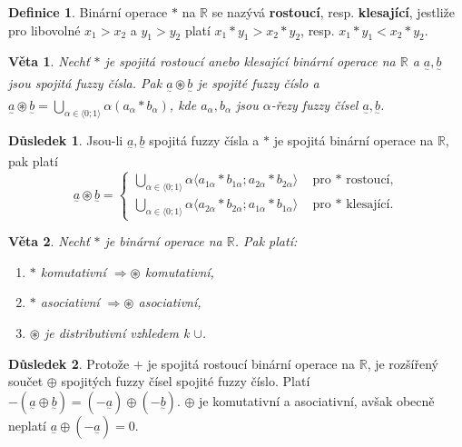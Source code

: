 \documentclass[a4]{report}
\newcommand{\fa}{\underset{^\sim}a}
\newcommand{\fb}{\underset{^\sim}b}
\newtheorem{theorem}{Věta}
\theoremstyle{definition}
\newtheorem{definition}{Definice}[section]
\newtheorem{dusledek}{Důsledek}[section]
\begin{document}
{\begin{definition}
Binární operace $\ast$ na $\mathbb{R}$ se nazývá \textbf{rostoucí}, resp. \textbf{klesající}, jestliže pro libovolné $x_1 > x_2$ a $y_1 > y_2$ platí $x_1 \ast y_1 > x_2 \ast y_2$, resp. $x_1 \ast y_1 < x_2 \ast y_2$.
\end{definition}

\begin{theorem}
Nechť $\ast$ je spojitá rostoucí anebo klesající binární operace na $\mathbb{R}$ a $\fa, \fb$ jsou spojitá fuzzy čísla. Pak $\fa \circledast \fb$ je spojité fuzzy číslo a $\fa \circledast \fb = \bigcup\limits_{\alpha \in \langle 0; 1 \rangle} \alpha (a_{\alpha} \ast b_{\alpha})$, kde $a_{\alpha}, b_{\alpha}$ jsou $\alpha$-řezy fuzzy čísel $\fa, \fb$.
\end{theorem}

\begin{dusledek}
Jsou-li $\fa, \fb$ spojitá fuzzy čísla a $\ast$ je spojitá binární operace na $\mathbb{R}$, pak platí
\begin{equation*}
\fa \circledast \fb =
\begin{cases}
\bigcup\limits_{\alpha \in \langle 0; 1 \rangle} \alpha \langle a_{1\alpha} \ast b_{1\alpha}; a_{2\alpha} \ast b_{2\alpha} \rangle \quad \text{pro $\ast$ rostoucí,}\\
\bigcup\limits_{\alpha \in \langle 0; 1 \rangle} \alpha \langle a_{2\alpha} \ast b_{2\alpha}; a_{1\alpha} \ast b_{1\alpha} \rangle \quad \text{pro $\ast$ klesající.}
\end{cases}
\end{equation*}
\end{dusledek}

\begin{theorem}
Nechť $\ast$ je binární operace na $\mathbb{R}$. Pak platí:
\begin{enumerate}
\item $\ast$ komutativní $\Rightarrow \circledast$ komutativní,
\item $\ast$ asociativní $\Rightarrow \circledast$ asociativní,
\item $\circledast$ je distributivní vzhledem k $\cup$.
\end{enumerate}
\end{theorem}

\begin{dusledek}
Protože $+$ je spojitá rostoucí binární operace na $\mathbb{R}$, je rozšířený součet $\oplus$ spojitých fuzzy čísel spojité fuzzy číslo. Platí $-(\fa \oplus \fb) = (-\fa) \oplus (-\fb)$. $\oplus$ je komutativní a asociativní, avšak obecně neplatí $\fa \oplus (-\fa) = 0$.
\end{dusledek}

}
\end{document}
